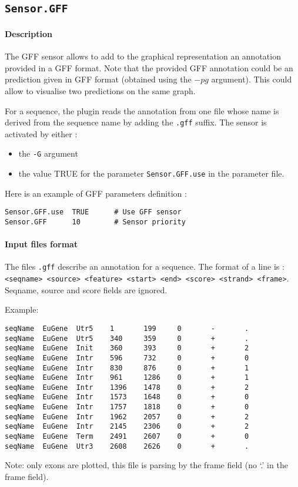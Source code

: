 
\subsection{\texttt{Sensor.GFF}}

\paragraph{Description}

The GFF sensor allows to add to the graphical representation an
annotation provided in a GFF format. Note that the provided GFF
annotation could be an \EuGenie prediction given in GFF format
(obtained using the $-pg$ argument). This could allow to visualise two
predictions on the same graph.

For a sequence, the plugin reads the annotation from one file whose
name is derived from the sequence name by adding the \texttt{.gff}
suffix.  The sensor is activated by either :
\begin{itemize}
\item the \texttt{-G} argument 
\item the value TRUE for the parameter \texttt{Sensor.GFF.use} in the
  parameter file.
\end{itemize}
Here is an example of GFF parameters definition :
\begin{Verbatim}[fontsize=\small]
Sensor.GFF.use  TRUE      # Use GFF sensor
Sensor.GFF      10        # Sensor priority
\end{Verbatim}

\paragraph{Input files format}

The files \texttt{.gff} describe an annotation for a sequence. The format of
a line is : \texttt{<seqname> <source> <feature> <start> <end> <score>
  <strand> <frame>}. Seqname, source and score fields are ignored.

Example:
\begin{Verbatim}[fontsize=\small]
seqName  EuGene  Utr5    1       199     0       -       .
seqName  EuGene  Utr5    340     359     0       +       .
seqName  EuGene  Init    360     393     0       +       2
seqName  EuGene  Intr    596     732     0       +       0
seqName  EuGene  Intr    830     876     0       +       1
seqName  EuGene  Intr    961     1286    0       +       1
seqName  EuGene  Intr    1396    1478    0       +       2
seqName  EuGene  Intr    1573    1648    0       +       0
seqName  EuGene  Intr    1757    1818    0       +       0
seqName  EuGene  Intr    1962    2057    0       +       2
seqName  EuGene  Intr    2145    2306    0       +       2
seqName  EuGene  Term    2491    2607    0       +       0
seqName  EuGene  Utr3    2608    2626    0       +       .
\end{Verbatim}
Note: only exons are plotted, this file is parsing by the frame field
(no `.' in the frame field).

